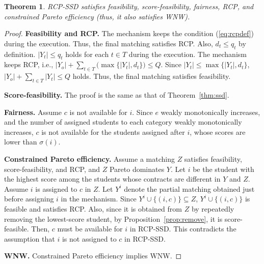 \documentclass[a4paper,twoside]{article}
\newtheorem{theorem}{Theorem}
\theoremstyle{definition}
\newcommand{\zh}[1]{\textcolor{red}{\textbf{Zhaohong says:} #1}}
\begin{document}

\begin{theorem}
\label{thm:rcpssd}
RCP-SSD satisfies feasibility, score-feasibility, fairness, RCP, and 
constrained Pareto efficiency (thus, it also satisfies WNW). 
\end{theorem}
\begin{proof}
\textbf{Feasibility and RCP.}
The mechanism keeps the condition (\ref{eq:rcpdef})
during the execution.
Thus, the final matching satisfies RCP. 
Also, $d_t\leq q_t$ by definition. 
$|Y_t|\leq q_t$ holds for each $t \in T$ during the execution.
The mechanism keeps RCP, i.e., 
$|Y_o| + \sum_{t\in T} \bigl(\max\{|Y_t|,d_t\}\bigr)\le Q$. 
Since $|Y_t| \leq \max\{|Y_t|,d_t\}$, 
$|Y_o| + \sum_{t\in T} |Y_t| \le Q$ holds. 
Thus, the final matching satisfies feasibility. 

\textbf{Score-feasibility.}
The proof is the same as that of Theorem~\ref{thm:ssd}.

\textbf{Fairness.}
Assume $c$ is not available for $i$. Since $e$ weakly monotonically increases, and the number of assigned students
to each category weakly monotonically increases, 
$c$ is not available for the students assigned after $i$, whose scores are lower than $\sigma(i)$.

\textbf{Constrained Pareto efficiency.}
Assume a matching $Z$ satisfies feasibility, score-feasibility, and RCP, and $Z$ Pareto
dominates $Y$. Let $i$ be the student with the highest score 
among the students whose contracts are different in $Y$ and 
$Z$. Assume $i$ is assigned to $c$ in $Z$. 
Let $Y^i$ denote the partial matching 
obtained just before assigning $i$ in the mechanism. 
Since $Y^i\cup\{(i,c)\}\subseteq Z$, 
$Y^i\cup\{(i,c)\}$ is feasible and satisfies RCP. 
Also, 
since it is obtained from $Z$ by repeatedly removing 
the lowest-score student, by Proposition~\ref{prop:remove},
it is score-feasible. Then, $c$ must be available for 
$i$ in RCP-SSD. This contradicts the assumption that
$i$ is not assigned to $c$ in RCP-SSD.

\textbf{WNW.}
Constrained Pareto efficiency implies WNW.
\end{proof}
\end{document}
